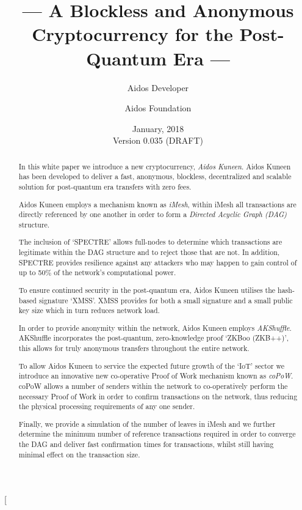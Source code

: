 \documentclass[a4paper,10pt,twocolumn]{article}
\title{--- A Blockless and Anonymous Cryptocurrency for the Post-Quantum Era ---}
\author{
	Aidos Developer \and Aidos Foundation
}
\date{January, 2018 \\ Version 0.035 (DRAFT)}
\begin{document}
\twocolumn[
	\maketitle

\begin{abstract}
		In this white paper we introduce a new cryptocurrency, \emph{Aidos Kuneen}. Aidos Kuneen has been developed to deliver 
		a fast, anonymous, blockless, decentralized and scalable solution for post-quantum era transfers with zero fees. 
		
		Aidos Kuneen employs a mechanism known as \emph{iMesh}, within iMesh all transactions are directly referenced by
		one another in order to form a \emph{Directed Acyclic Graph (DAG)} structure.
		
		The inclusion of `SPECTRE' allows full-nodes to determine which transactions are legitimate within the DAG structure 
		and to reject those that are not. In addition, SPECTRE provides resilience against any attackers who may happen to gain 
		control of up to 50\% of the network's computational power.
		
		To ensure continued security in the post-quantum era, Aidos Kuneen utilises the hash-based signature `XMSS'. XMSS
		provides for both a small signature and a small public key size which in turn reduces network load.
	
		In order to provide anonymity within the network, Aidos Kuneen employs \emph{AKShuffle}. AKShuffle 	
		incorporates the post-quantum, zero-knowledge proof `ZKBoo (ZKB++)', this allows for truly anonymous transfers 
		throughout the entire network.
		
		To allow Aidos Kuneen to service the expected future growth of the `IoT' sector we introduce an innovative new 
		co-operative Proof of Work mechanism known as \emph{coPoW}\@. coPoW allows a number of senders within the network to 
		co-operatively perform the necessary Proof of Work in order to confirm transactions on the network, thus reducing 
		the physical processing requirements of any one sender.
		
		Finally, we provide a simulation of the number of leaves in iMesh and we further determine the minimum number of 
		reference transactions required in order to converge the DAG and deliver fast confirmation times for transactions, 
		whilst still having minimal effect on the transaction size.
		
		\end{abstract}

		\vspace{0.25cm}
\end{document}
